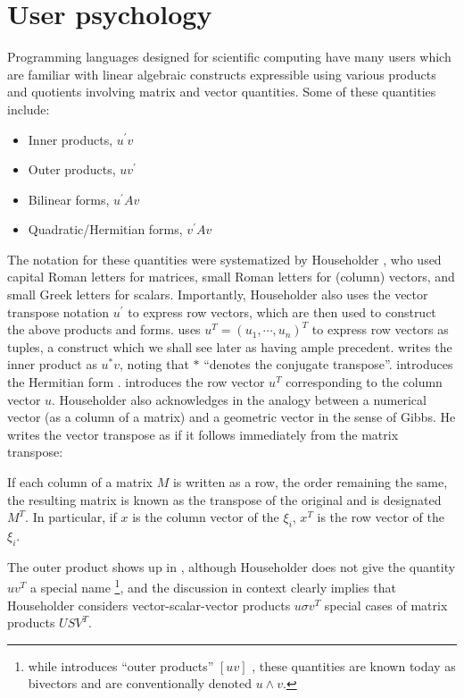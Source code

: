 \section{User psychology}

Programming languages designed for scientific computing have many users which are familiar with linear algebraic constructs expressible using various products and quotients involving matrix and vector quantities. Some of these quantities include:

\begin{itemize}
  \item Inner products, $u^\prime v$
  \item Outer products, $u v^\prime$
  \item Bilinear forms, $u^\prime A v$
  \item Quadratic/Hermitian forms, $v^\prime A v$
\end{itemize}

The notation for these quantities were systematized by Householder \cite{Householder1953,Householder1955}, who used capital Roman letters for matrices, small Roman letters for (column) vectors, and small Greek letters for scalars. Importantly, Householder also uses the vector transpose notation $u^\prime$ to express row vectors, which are then used to construct the above products and forms. \cite{Householder1955} uses $u^T = (u_1, \cdots, u_n)^T$ to express row vectors as tuples, a construct which we shall see later as having ample precedent. \cite{Householder1955} writes the inner product as $u^* v$, noting that $*$ ``denotes the conjugate transpose''. \cite[Sec. 4.01]{Householder1953} introduces the Hermitian form . \cite[Sec. 2.04]{Householder1953} introduces the row vector $u^T$ corresponding to the column vector $u$. Householder also acknowledges in \cite[Sec. 2.04]{Householder1953} the analogy between a numerical vector (as a column of a matrix) and a geometric vector in the sense of Gibbs. He writes the vector transpose as if it follows immediately from the matrix transpose:

If each column of a matrix $M$ is written as a row, the order remaining the same, the resulting matrix is known as the transpose of the original and is designated $M^T$. In particular, if $x$ is the column vector of the $\xi_i$, $x^T$ is the row vector of the $\xi_i$.

The outer product shows up in \cite[Sec. 2.24]{Householder1953}, although Householder does not give the quantity $u v^T$ a special name \footnote{while \cite[Sec. 2.03]{Householder1953} introduces ``outer products'' $[u v]$ , these quantities are known today as bivectors and are conventionally denoted $u \wedge v$.}, and the discussion in context clearly implies that Householder considers vector-scalar-vector products $u \sigma v^T$ special cases of matrix products $U S V^T$.


